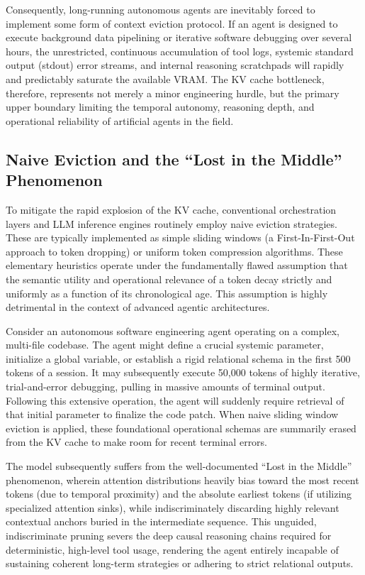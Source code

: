 \documentclass[11pt,a4paper]{article}
\begin{document}
Consequently, long-running autonomous agents are inevitably forced to implement some form of context eviction protocol. If an agent is designed to execute background data pipelining or iterative software debugging over several hours, the unrestricted, continuous accumulation of tool logs, systemic standard output (stdout) error streams, and internal reasoning scratchpads will rapidly and predictably saturate the available VRAM.\cite{7} The KV cache bottleneck, therefore, represents not merely a minor engineering hurdle, but the primary upper boundary limiting the temporal autonomy, reasoning depth, and operational reliability of artificial agents in the field.

\subsection{Naive Eviction and the ``Lost in the Middle'' Phenomenon}
To mitigate the rapid explosion of the KV cache, conventional orchestration layers and LLM inference engines routinely employ naive eviction strategies. These are typically implemented as simple sliding windows (a First-In-First-Out approach to token dropping) or uniform token compression algorithms. These elementary heuristics operate under the fundamentally flawed assumption that the semantic utility and operational relevance of a token decay strictly and uniformly as a function of its chronological age. This assumption is highly detrimental in the context of advanced agentic architectures.

Consider an autonomous software engineering agent operating on a complex, multi-file codebase. The agent might define a crucial systemic parameter, initialize a global variable, or establish a rigid relational schema in the first 500 tokens of a session.\cite{8} It may subsequently execute 50,000 tokens of highly iterative, trial-and-error debugging, pulling in massive amounts of terminal output. Following this extensive operation, the agent will suddenly require retrieval of that initial parameter to finalize the code patch. When naive sliding window eviction is applied, these foundational operational schemas are summarily erased from the KV cache to make room for recent terminal errors.

The model subsequently suffers from the well-documented ``Lost in the Middle'' phenomenon, wherein attention distributions heavily bias toward the most recent tokens (due to temporal proximity) and the absolute earliest tokens (if utilizing specialized attention sinks), while indiscriminately discarding highly relevant contextual anchors buried in the intermediate sequence.\cite{8} This unguided, indiscriminate pruning severs the deep causal reasoning chains required for deterministic, high-level tool usage, rendering the agent entirely incapable of sustaining coherent long-term strategies or adhering to strict relational outputs.
\end{document}
